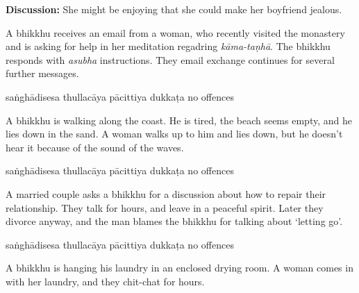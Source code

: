 \begin{exam}{\autoExamName}
\begin{problem*}
\begin{parts}
  \bigskip

  \textbf{Discussion:} She might be enjoying that she could make her boyfriend jealous.

  \bigskip

\item A bhikkhu receives an email from a woman, who recently visited the
  monastery and is asking for help in her meditation regadring \textit{kāma-taṇhā}.
  The bhikkhu responds with \textit{asubha} instructions. They email exchange
  continues for several further messages.

  \bigskip

  \begin{answers}{5}
    \bChoices
     saṅghādisesa\eAns
     thullacāya\eAns
     pācittiya\eAns
     dukkaṭa\eAns
     no offences\eAns
    \eChoices
  \end{answers}
  
  \bigskip

\item A bhikkhu is walking along the coast. He is tired, the beach seems empty,
  and he lies down in the sand. A woman walks up to him and lies down, but he
  doesn't hear it because of the sound of the waves.

  \bigskip

  \begin{answers}{5}
    \bChoices
     saṅghādisesa\eAns
     thullacāya\eAns
     pācittiya\eAns
     dukkaṭa\eAns
     no offences\eAns
    \eChoices
  \end{answers}

  \bigskip

\item A married couple asks a bhikkhu for a discussion about how to repair their
  relationship. They talk for hours, and leave in a peaceful spirit. Later they
  divorce anyway, and the man blames the bhikkhu for talking about `letting go'.

  \bigskip

  \begin{answers}{5}
    \bChoices
     saṅghādisesa\eAns
     thullacāya\eAns
     pācittiya\eAns
     dukkaṭa\eAns
     no offences\eAns
    \eChoices
  \end{answers}

  \bigskip

\item A bhikkhu is hanging his laundry in an enclosed drying room. A woman comes in with
  her laundry, and they chit-chat for hours.


\end{parts}
\end{problem*}
\end{exam}
